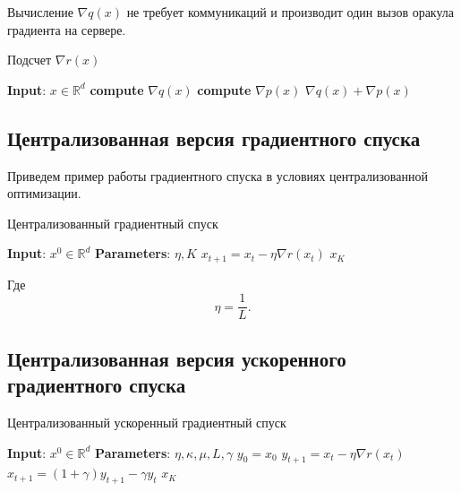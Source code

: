 \documentclass[a4paper,12pt]{extarticle}
\begin{document}
    Вычисление $\nabla q(x)$ не требует коммуникаций и производит один вызов оракула градиента на сервере. 

    \begin{algorithm}[]
    \caption{Подсчет $\nabla r(x)$}
    \begin{algorithmic}[1]
    \STATE{} \textbf{Input}: $x \in \mathbb{R}^d$
    \STATE{} \textbf{compute} $\nabla q(x)$
    \STATE{} \textbf{compute} $\nabla p(x)$
    \RETURN{} $\nabla q(x) + \nabla p(x)$
    \end{algorithmic}
    \end{algorithm}

\subsection{Централизованная версия градиентного спуска}

Приведем пример работы градиентного спуска в условиях централизованной оптимизации.

\begin{algorithm}[]
    \caption{Централизованный градиентный спуск}
    \begin{algorithmic}[1]

    \STATE{} \textbf{Input}: $x^0 \in \mathbb{R}^d$
    \STATE{} \textbf{Parameters}: $\eta, K$
    \STATE{} $x_{t + 1} = x_t - \eta \nabla r(x_t)$
    \ENDFOR{}
    \RETURN{} $x_{K}$
    \end{algorithmic}
\end{algorithm}

Где 
$$ \textstyle \eta = \frac{1}{L}.$$

\subsection{Централизованная версия ускоренного градиентного спуска}

\begin{algorithm}[]
    \caption{Централизованный ускоренный градиентный спуск}
    \begin{algorithmic}[1]

    \STATE{} \textbf{Input}: $x^0 \in \mathbb{R}^d$
    \STATE{} \textbf{Parameters}: $\eta, \kappa, \mu, L, \gamma$
    \STATE{} $y_0 = x_0$
    \STATE{} $y_{t + 1} = x_{t} - \eta \nabla r(x_t)$
    \STATE{} $x_{t + 1} = (1 + \gamma)y_{t+1} - \gamma y_{t}$
    \ENDFOR{}
    \RETURN{} $x_{K}$
    \end{algorithmic}
\end{algorithm}
\end{document}

